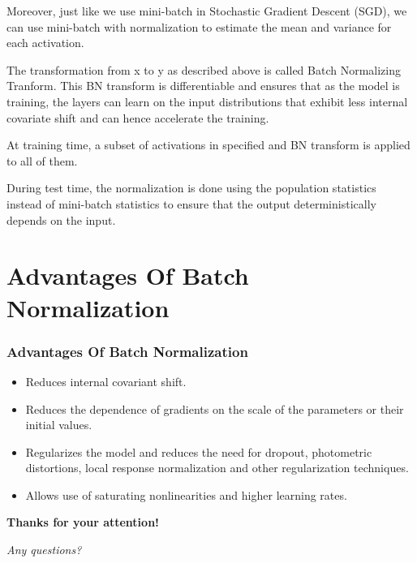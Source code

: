 \begin{frame}
        Moreover, just like we use mini-batch in Stochastic Gradient Descent (SGD), we can use mini-batch with normalization to estimate the mean and variance for each activation.\par
        The transformation from x to y as described above is called Batch Normalizing Tranform. This BN transform is differentiable and ensures that as the model is training, the layers can learn on the input distributions that exhibit less internal covariate shift and can hence accelerate the training.\par
        At training time, a subset of activations in specified and BN transform is applied to all of them.\par
        During test time, the normalization is done using the population statistics instead of mini-batch statistics to ensure that the output deterministically depends on the input.\par
\end{frame}
\section{Advantages Of Batch Normalization}
\begin{frame}
        \frametitle{Advantages Of Batch Normalization}
		 \begin{itemize}
                 \item Reduces internal covariant shift.
                 \item Reduces the dependence of gradients on the scale of the parameters or their initial values.
                 \item Regularizes the model and reduces the need for dropout, photometric distortions, local response normalization and other regularization techniques.
				\hilite <4> \item Allows use of saturating nonlinearities and higher learning rates.

        \end{itemize}

\end{frame}
\begin{frame}

	\begin{center}
	\Huge{\textbf{Thanks for your attention!}}

	\Huge{\textit{Any questions?}}
\end{center}
\end{frame}


